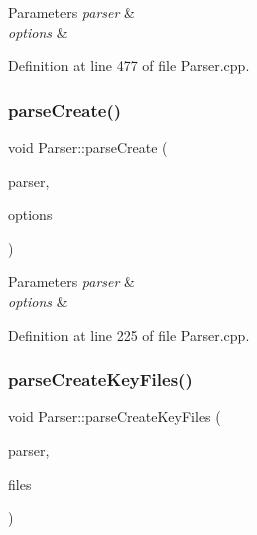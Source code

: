 \begin{DoxyParams}{Parameters}
{\em parser} & \\
\hline
{\em options} & \\
\hline
\end{DoxyParams}


Definition at line 477 of file Parser.\+cpp.

\mbox{\label{namespace_parser_aef069760011ee9f2066a254ab84f9b7c}} 
\subsubsection{\texorpdfstring{parse\+Create()}{parseCreate()}}
{\footnotesize\ttfamily void Parser\+::parse\+Create (\begin{DoxyParamCaption}\item[{Q\+Command\+Line\+Parser \&}]{parser,  }\item[{Q\+Shared\+Pointer$<$ \hyperlink{struct_gost_crypt_1_1_core_1_1_create_volume_request}{Gost\+Crypt\+::\+Core\+::\+Create\+Volume\+Request} $>$}]{options }\end{DoxyParamCaption})}


\begin{DoxyParams}{Parameters}
{\em parser} & \\
\hline
{\em options} & \\
\hline
\end{DoxyParams}


Definition at line 225 of file Parser.\+cpp.

\mbox{\label{namespace_parser_a1d19ba15381c47283b17a5ceddf41da5}} 
\subsubsection{\texorpdfstring{parse\+Create\+Key\+Files()}{parseCreateKeyFiles()}}
{\footnotesize\ttfamily void Parser\+::parse\+Create\+Key\+Files (\begin{DoxyParamCaption}\item[{Q\+Command\+Line\+Parser \&}]{parser,  }\item[{Q\+String\+List \&}]{files }\end{DoxyParamCaption})}


